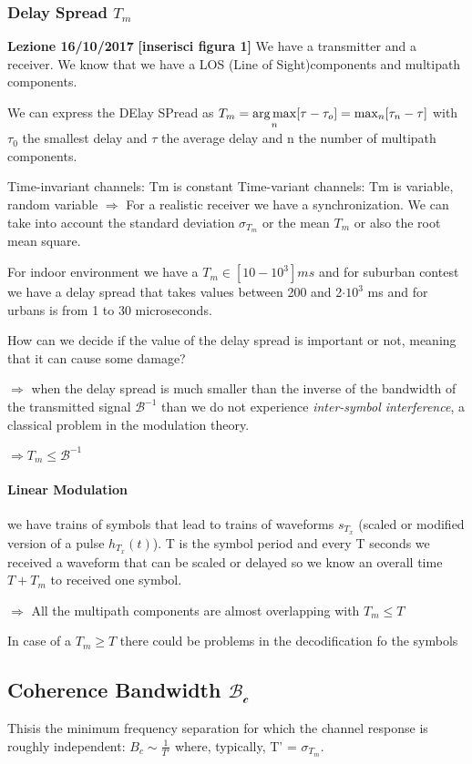 \subsubsection{Delay Spread $T_m$}
\textbf{Lezione 16/10/2017}
\textbf{[inserisci figura 1]}
We have a transmitter and a receiver.
We know that we have a LOS (Line of Sight)components and multipath components.

We can express the DElay SPread as $T_m = \operatorname*{arg\,max}\limits_n[\tau - \tau_o] = \max_n[\tau_n - \tau]$ with $\tau_0$ the smallest delay and $\tau$ the average delay and n the number of multipath components.

Time-invariant channels: Tm is constant
Time-variant channels: Tm is variable, random variable
$\Rightarrow$ For a realistic receiver we have a synchronization.
We can take into account the standard deviation $\sigma_{T_m}$ or the mean $T_m$ or also the root mean square.

For indoor environment we have a $T_m \in [10-10^3]ms$ and for suburban contest we have a delay spread that takes values between 200 and 2$\cdot 10^3$ ms and for urbans is from 1 to 30 microseconds.

How can we decide if the value of the delay spread is important or not, meaning that it can cause some damage?

$\Rightarrow$ when the delay spread is much smaller than the inverse of the bandwidth of the transmitted signal $\mathcal{B}^{-1}$ than we do not experience \textit{inter-symbol interference}, a classical problem in the modulation theory.

$\Rightarrow T_m \leq \mathcal{B}^{-1}$

\paragraph{Linear Modulation}
we have trains of symbols that lead to trains of waveforms $s_{T_x}$ (scaled or modified version of a pulse $h_{T_x}(t)$). T is the symbol period and every T seconds we received a waveform that can be scaled or delayed so we know an overall time $T + T_m$ to received one symbol.

$\Rightarrow$ All the multipath components are almost overlapping with $T_m \leq T$

In case of a $T_m \geq T$ there could be problems in the decodification fo the symbols

\subsection{Coherence Bandwidth $\mathcal{B_c}$}
Thisis the minimum frequency separation for which the channel response is roughly independent: $B_c \sim \frac{1}{T'}$ where, typically, T' = $\sigma_{T_m}$.

